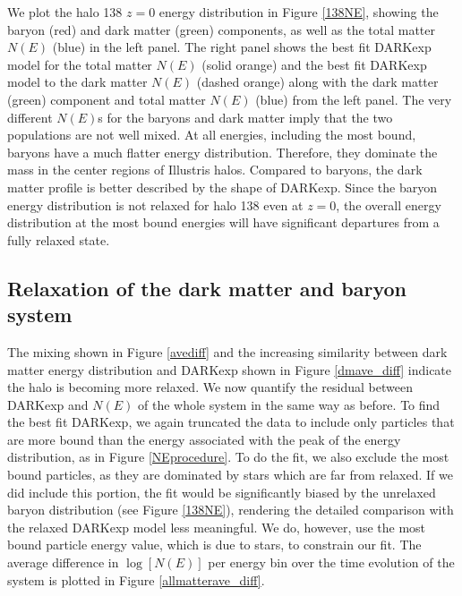 \documentclass[a4paper,11pt]{article}
\begin{document}
We plot the halo 138 $z=0$ energy distribution in Figure \ref{138NE}, 
showing the baryon (red) and dark matter (green) components, as well as the total matter $N(E)$ (blue) in the left panel.  The right panel shows the best fit DARKexp model for the total matter 
$N(E)$ (solid orange) and the best fit DARKexp model to the dark matter $N(E)$ (dashed orange) along with the dark matter (green) component and total matter 
$N(E)$ (blue) from the left panel.  The very different $N(E)$s for the baryons and dark matter imply that the two populations are not well mixed.  At all 
energies, including the most bound, baryons have a much flatter energy distribution.  Therefore, they dominate the mass in the center regions of Illustris 
halos.  Compared to baryons, the dark matter profile is better described by the shape of DARKexp.  Since the baryon energy distribution is not relaxed for 
halo 138 even at $z=0$, the overall energy distribution at the most bound energies will have significant departures from a fully relaxed state.  


\subsection{Relaxation of the dark matter and baryon system}

The mixing shown in Figure \ref{avediff} and the increasing similarity between dark matter energy distribution and DARKexp shown in Figure \ref{dmave_diff} indicate the halo is 
becoming more relaxed.  We now quantify the residual between DARKexp and $N(E)$ of the whole system
in the same way as before.  To find the best fit DARKexp, we again truncated the data to include only particles that are more bound than the energy associated with the peak of the 
energy distribution, as in Figure \ref{NEprocedure}.  To do the fit, we also exclude the most bound particles, as they are dominated by stars which are far 
from relaxed.  If we did include this portion, the fit would be significantly biased by the unrelaxed baryon distribution (see Figure \ref{138NE}), 
rendering the detailed comparison with the relaxed DARKexp model less meaningful. We do, however, use the most bound particle energy value, which is due to 
stars, to constrain our fit. The average difference in $\log[N(E)]$ per energy bin over the time evolution of the system is plotted in 
Figure \ref{allmatterave_diff}.
\end{document}
